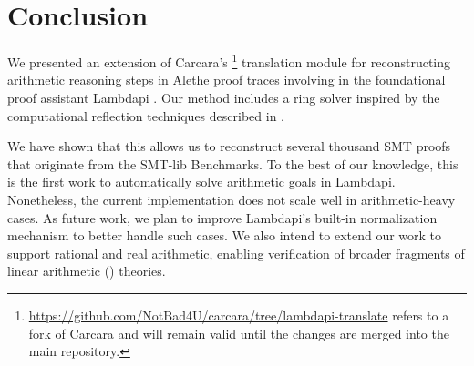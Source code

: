 \documentclass[runningheads,envcountsame]{llncs}
\begin{document}
\section{Conclusion}
\label{sec:conclusion}

We presented an extension of Carcara's \cite{carcara}\footnote{\url{https://github.com/NotBad4U/carcara/tree/lambdapi-translate} refers to a fork of Carcara and will remain valid until the changes are merged into the main repository.}
 translation module \cite{ColtellacciMD24} for reconstructing arithmetic reasoning steps in Alethe proof traces involving  in the foundational proof assistant Lambdapi \cite{lambdapi}.
Our method includes a ring solver inspired by the computational reflection techniques described in \cite{reflection-origin-coq,ring-coq}.

We have shown that this allows us to reconstruct several thousand SMT proofs that originate from the SMT-lib Benchmarks.
To the best of our knowledge, this is the first work to automatically solve arithmetic goals in Lambdapi.
Nonetheless, the current implementation does not  scale well in arithmetic-heavy cases.
As future work, we plan to improve Lambdapi's built-in normalization mechanism to better handle such cases.
We also intend to extend our work to support rational and real arithmetic, enabling verification of broader fragments of linear arithmetic () theories.





\end{document}
